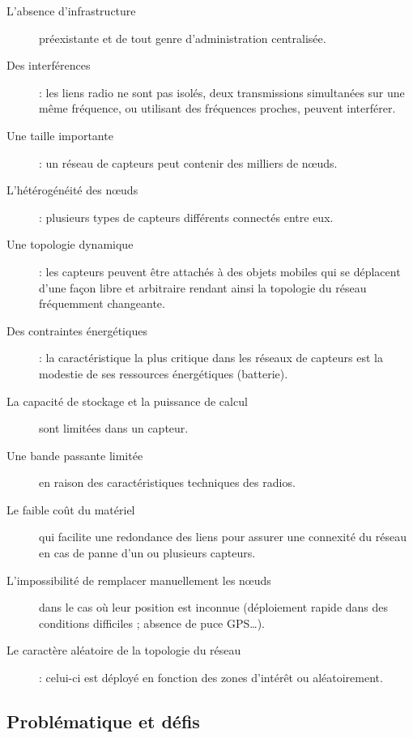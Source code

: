 \begin{description}
\item[L'absence d’infrastructure] préexistante et de tout genre d’administration centralisée.

\item[Des interférences] : les liens radio ne sont pas isolés, deux transmissions simultanées sur une même fréquence, ou utilisant des fréquences proches, peuvent interférer.

\item[Une taille importante] : un réseau de capteurs peut contenir des milliers de nœuds.

\item[L'hétérogénéité des nœuds] : plusieurs types de capteurs différents connectés entre eux.


\item[Une topologie dynamique] : les capteurs peuvent être attachés à des objets mobiles qui se déplacent d’une façon libre et arbitraire rendant ainsi la topologie du réseau fréquemment changeante.

\item[Des contraintes énergétiques] : la caractéristique la plus critique dans les réseaux de capteurs est la modestie de ses ressources énergétiques (batterie).

\item[La capacité de stockage et la puissance de calcul] sont limitées dans un capteur.

\item[Une bande passante limitée] en raison des caractéristiques techniques des radios.

\item[Le faible coût du matériel] qui facilite une redondance des liens pour assurer une connexité du réseau en cas de panne d’un ou plusieurs capteurs.

\item[L’impossibilité de remplacer manuellement les nœuds] dans le cas où leur position est inconnue (déploiement rapide dans des conditions difficiles ; absence de puce GPS…).

\item[Le caractère aléatoire de la topologie du réseau] : celui-ci est déployé en fonction des zones d'intérêt ou aléatoirement.
\end{description}



\subsection{Problématique et défis}

